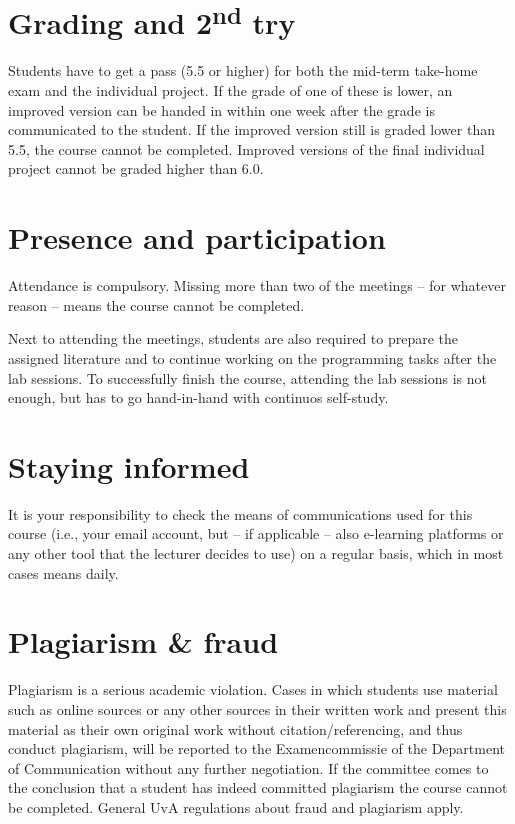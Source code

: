 \documentclass[a4paper,10pt,twocolumn]{report}
\begin{document}
\section{Grading and 2\textsuperscript{nd} try}
Students have to get a pass (5.5 or higher) for both the mid-term take-home exam and the individual project. If the grade of one of these is lower, an improved version can be handed in within one week after the grade is communicated to the student. If the improved version still is graded lower than 5.5, the course cannot be completed. Improved versions of the final individual project cannot be graded higher than 6.0. 

\section{Presence and participation}
Attendance is compulsory. Missing more than two of the meetings – for whatever reason – means the course cannot be completed.

Next to attending the meetings, students are also required to prepare the assigned literature and to continue working on the programming tasks after the lab sessions. To successfully finish the course, attending the lab sessions is not enough, but has to go hand-in-hand with continuos self-study.


\section{Staying informed}
It is your responsibility to check the means of communications used for this course (i.e., your email account, but -- if applicable -- also e-learning platforms or any other tool that the lecturer decides to use) on a regular basis, which in most cases means daily.

\section{Plagiarism \& fraud}
Plagiarism is a serious academic violation. Cases in which students use material such as online sources or any other sources in their written work and present this material as their own original work without citation/referencing, and thus conduct plagiarism, will be reported to the Examencommissie of the Department of Communication without any further negotiation. If the committee comes to the conclusion that a student has indeed committed plagiarism the course cannot be completed.
General UvA regulations about fraud and plagiarism apply.
\end{document}
